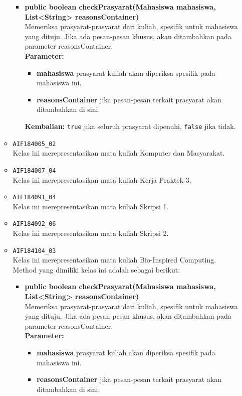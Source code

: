 \begin{enumerate}
\begin{itemize}
\begin{itemize}
			\item \textbf{public boolean checkPrasyarat(Mahasiswa mahasiswa, List<String> reasonsContainer)}\\
			Memeriksa prasyarat-prasyarat dari kuliah, spesifik untuk mahasiswa yang dituju. Jika ada pesan-pesan khusus, akan ditambahkan pada parameter reasonsContainer.\\
			\textbf{Parameter:}
			\begin{itemize}
				\item \textbf{mahasiswa} prasyarat kuliah akan diperiksa spesifik pada mahasiswa ini.
				\item \textbf{reasonsContainer} jika pesan-pesan terkait prasyarat akan ditambahkan di sini.
			\end{itemize}
			\textbf{Kembalian:} \texttt{true} jika seluruh prasyarat dipenuhi, \texttt{false} jika tidak.
		\end{itemize}
		\item \texttt{AIF184005\_02} \\
		Kelas ini merepresentasikan mata kuliah Komputer dan Masyarakat.
		\item \texttt{AIF184007\_04} \\
		Kelas ini merepresentasikan mata kuliah Kerja Praktek 3.
		\item \texttt{AIF184091\_04} \\
		Kelas ini merepresentasikan mata kuliah Skripsi 1.
		\item \texttt{AIF184092\_06} \\
		Kelas ini merepresentasikan mata kuliah Skripsi 2.
		\item \texttt{AIF184104\_03} \\
		Kelas ini merepresentasikan mata kuliah Bio-Inspired Computing. Method yang dimiliki kelas ini adalah sebagai berikut: 
		\begin{itemize}
			\item \textbf{public boolean checkPrasyarat(Mahasiswa mahasiswa, List<String> reasonsContainer)}\\
			Memeriksa prasyarat-prasyarat dari kuliah, spesifik untuk mahasiswa yang dituju. Jika ada pesan-pesan khusus, akan ditambahkan pada parameter reasonsContainer.\\
			\textbf{Parameter:}
			\begin{itemize}
				\item \textbf{mahasiswa} prasyarat kuliah akan diperiksa spesifik pada mahasiswa ini.
				\item \textbf{reasonsContainer} jika pesan-pesan terkait prasyarat akan ditambahkan di sini.

\end{itemize}
\end{itemize}
\end{itemize}
\end{enumerate}
